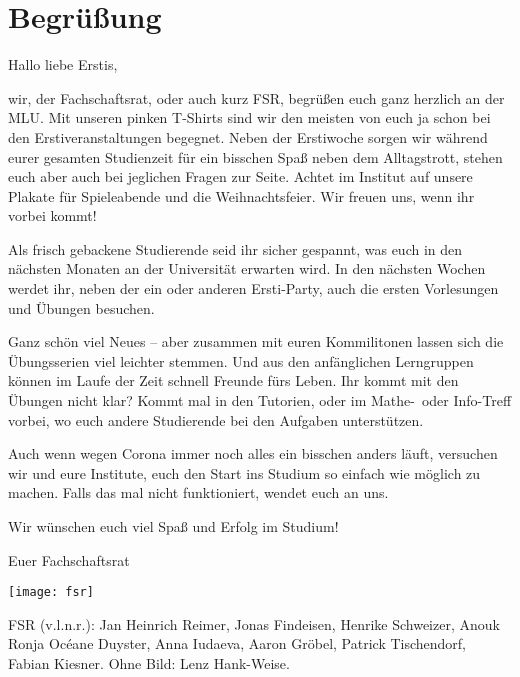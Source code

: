 \section{Begrüßung}

\begin{spacing}{1.5}
    \setlength{\parskip}{1.65ex}

    Hallo liebe Erstis,

    wir, der Fachschaftsrat, oder auch kurz FSR, 
    begrüßen euch ganz herzlich an der MLU.
    Mit unseren pinken T-Shirts sind wir den meisten 
    von euch ja schon bei den Erstiveranstaltungen begegnet.
    Neben der Erstiwoche sorgen wir während eurer gesamten Studienzeit
    für ein bisschen Spaß neben dem Alltagstrott, 
    stehen euch aber auch bei jeglichen Fragen zur Seite.
    Achtet im Institut auf unsere Plakate für Spieleabende und die Weihnachtsfeier.
    Wir freuen uns, wenn ihr vorbei kommt!

    Als frisch gebackene Studierende seid ihr sicher gespannt, 
    was euch in den nächsten Monaten 
    an der Universität erwarten wird. 
    In den nächsten Wochen werdet ihr, 
    neben der ein oder anderen Ersti-Party,
    auch die ersten Vorlesungen und Übungen besuchen.

    Ganz schön viel Neues -- 
    aber zusammen mit euren Kommilitonen 
    lassen sich die Übungsserien viel leichter stemmen.
    Und aus den anfänglichen Lerngruppen 
    können im Laufe der Zeit schnell Freunde fürs Leben.
    Ihr kommt mit den Übungen nicht klar? 
    Kommt mal in den Tutorien, 
    oder im Mathe-~oder Info-Treff vorbei, 
    wo euch andere Studierende bei den Aufgaben unterstützen.

    Auch wenn wegen Corona immer noch alles ein bisschen anders läuft,
    versuchen wir und eure Institute, euch den Start ins Studium 
    so einfach wie möglich zu machen. Falls das mal nicht funktioniert, wendet euch an uns.

    Wir wünschen euch viel Spaß und Erfolg im Studium!

    Euer Fachschaftsrat \\
\end{spacing}

\begin{center}
    \texttt{[image: fsr]}
\end{center}%
FSR (v.l.n.r.): 
Jan Heinrich Reimer,
Jonas Findeisen,
Henrike Schweizer,
Anouk Ronja Océane Duyster,
Anna Iudaeva,
Aaron Gröbel, 
Patrick Tischendorf,
Fabian Kiesner.
Ohne Bild: Lenz Hank-Weise.

